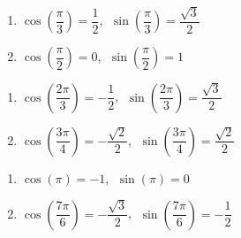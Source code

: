 \begin{multicols}{2}

\begin{enumerate}

\setcounter{enumi}{\value{HW}}

\item $\cos \left(\dfrac{\pi}{3}\right) = \dfrac{1}{2}$, $\; \sin \left(\dfrac{\pi}{3}\right) = \dfrac{\sqrt{3}}{2}$

\item $\cos \left(\dfrac{\pi}{2}\right) = 0$, $\; \sin \left(\dfrac{\pi}{2}\right) = 1$ 

\setcounter{HW}{\value{enumi}}

\end{enumerate}

\end{multicols}

\begin{multicols}{2}

\begin{enumerate}

\setcounter{enumi}{\value{HW}}

\item $\cos\left(\dfrac{2\pi}{3}\right) = -\dfrac{1}{2}$, $\; \sin \left(\dfrac{2\pi}{3}\right) = \dfrac{\sqrt{3}}{2}$

\item $\cos \left(\dfrac{3\pi}{4} \right) = -\dfrac{\sqrt{2}}{2}$, $\; \sin \left(\dfrac{3\pi}{4} \right) = \dfrac{\sqrt{2}}{2}$

\setcounter{HW}{\value{enumi}}

\end{enumerate}

\end{multicols}

\begin{multicols}{2}

\begin{enumerate}

\setcounter{enumi}{\value{HW}}

\item $\cos(\pi) = -1$, $\; \sin(\pi) = 0$ 

\item $\cos\left(\dfrac{7\pi}{6}\right) = -\dfrac{\sqrt{3}}{2}$, $\; \sin\left(\dfrac{7\pi}{6}\right) = -\dfrac{1}{2}$

\setcounter{HW}{\value{enumi}}

\end{enumerate}

\end{multicols}

